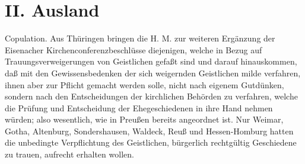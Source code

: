 \section{II. Ausland}

Copulation. Aus Thüringen bringen die H. M. zur weiteren Ergänzung der Eisenacher Kirchenconferenzbeschlüsse diejenigen, welche in Bezug auf Trauungsverweigerungen von Geistlichen gefaßt sind und darauf hinauskommen, daß mit den Gewissensbedenken der sich weigernden Geistlichen milde verfahren, ihnen aber zur Pflicht gemacht werden solle, nicht nach eigenem Gutdünken, sondern nach den Entscheidungen der kirchlichen Behörden zu verfahren, welche die Prüfung und Entscheidung der Ehegeschiedenen in ihre Hand nehmen würden; also wesentlich, wie in Preußen bereits angeordnet ist. Nur Weimar, Gotha, Altenburg, Sondershausen, Waldeck, Reuß und Hessen-Homburg hatten die unbedingte Verpflichtung des Geistlichen, bürgerlich rechtgültig Geschiedene zu trauen, aufrecht erhalten wollen.
